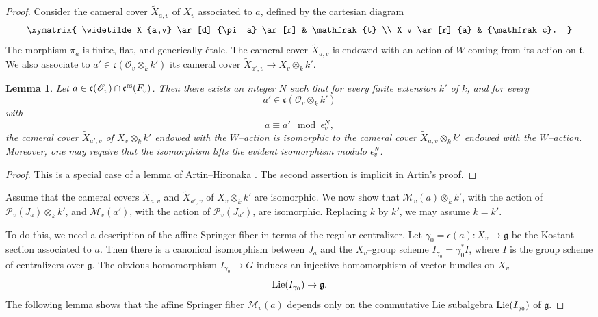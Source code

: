 \documentclass[12pt,english]{smfart}
\numberwithin{equation}{subsection}
\newtheorem{lemma}[equation]{Lemma}
\theoremstyle{remark}
\newcommand\calP{{\mathscr P}}
\newcommand\calM{{\mathscr M}}
\newcommand\calO{{\mathscr O}}
\newcommand\frakg{{\mathfrak g}}
\newcommand\frakc{{\mathfrak c}}
\newcommand\rs{{\rm rs}}
\begin{document}
\begin{proof}
Consider the cameral cover $\widetilde X_{a,v}$ of $X_v$ associated to $a$, defined by the cartesian diagram
$$
\xymatrix{
\widetilde X_{a,v} \ar[d]_{\pi_a} \ar[r] & \mathfrak{t} \\
X_v \ar[r]_{a} & \frakc.
}
$$
The morphism $\pi_a$ is finite, flat, and generically \'etale. The cameral cover $\widetilde X_{a,v}$ is endowed with an action of $W$ coming from its action on $\mathfrak{t}$. We also associate to $a'\in\frakc(\calO_v\otimes_k k')$ its cameral cover $\widetilde X_{a',v}\to X_v\otimes_k k'$.

\begin{lemma}
Let $a\in\frakc(\calO_v)\cap \frakc^\rs(F_v)$. Then there exists an integer $N$ such that for every finite extension $k'$ of $k$, and for every
$$
a'\in\frakc(\calO_v\otimes_k k')
$$
with
$$
a\equiv a' \mod \epsilon_v^N,
$$
the cameral cover $\widetilde X_{a',v}$ of $X_v\otimes_k k'$ endowed with the $W$--action is isomorphic to the cameral cover $\widetilde X_{a,v}\otimes_k k'$ endowed with the $W$--action. Moreover, one may require that the isomorphism lifts the evident isomorphism modulo $\epsilon_v^N$.
\end{lemma}

\begin{proof}
This is a special case of a lemma of Artin--Hironaka \cite[Lemma 3.12]{Artin}. The second assertion is implicit in Artin's proof.
\end{proof}

Assume that the cameral covers $\widetilde X_{a,v}$ and $\widetilde X_{a',v}$ of $X_v\otimes_k k'$ are isomorphic. We now show that $\calM_v(a)\otimes_k k'$, with the action of $\calP_v(J_a)\otimes_k k'$, and $\calM_v(a')$, with the action of $\calP_v(J_{a'})$, are isomorphic. Replacing $k$ by $k'$, we may assume $k=k'$.

To do this, we need a description of the affine Springer fiber in terms of the regular centralizer. Let $\gamma_0=\epsilon(a):X_v\to\frakg$ be the Kostant section associated to $a$. Then there is a canonical isomorphism between $J_a$ and the $X_v$--group scheme $I_{\gamma_0}=\gamma_0^*I$, where $I$ is the group scheme of centralizers over $\frakg$. The obvious homomorphism $I_{\gamma_0}\to G$ induces an injective homomorphism of vector bundles on $X_v$
$$
{\rm Lie}(I_{\gamma_0})\to \frakg.
$$
The following lemma shows that the affine Springer fiber $\calM_v(a)$ depends only on the commutative Lie subalgebra ${\rm Lie}(I_{\gamma_0})$ of $\frakg$.


\end{proof}
\end{document}
